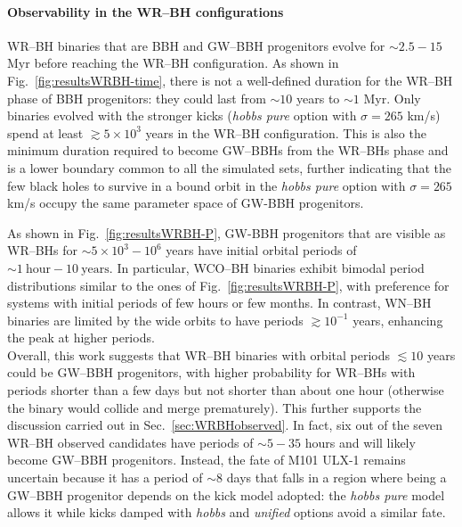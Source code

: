 \documentclass[a4paper,titlepage]{book}     	%
\begin{document}
\paragraph{Observability in the WR--BH configurations}
WR--BH binaries that are BBH and GW--BBH progenitors evolve for $\sim 2.5 - 15$ Myr before reaching the WR--BH configuration. As shown in Fig.\ \ref{fig:resultsWRBH-time}, there is not a well-defined duration for the WR--BH phase of BBH progenitors: they could last from $\sim 10$ years to $\sim 1$ Myr. Only binaries evolved with the stronger kicks (\emph{hobbs pure} option with $\sigma=265$ km/s) spend at least $\gtrsim 5 \times 10^3$ years in the WR--BH configuration. This is also the minimum duration required to become GW--BBHs from the WR--BHs phase and is a lower boundary common to all the simulated sets, further indicating that the few black holes to survive in a bound orbit in the \emph{hobbs pure} option with $\sigma=265$ km/s occupy the same parameter space of GW-BBH progenitors.

As shown in Fig.\ \ref{fig:resultsWRBH-P}, GW-BBH progenitors that are visible as WR--BHs for $\sim 5 \times 10^3 - 10^6$ years have initial orbital periods of $\sim 1~\text{hour} - 10~\text{years}$. In particular, WCO--BH binaries exhibit bimodal period distributions similar to the ones of Fig.\ \ref{fig:resultsWRBH-P}, with preference for systems with initial periods of few hours or few months. In contrast, WN--BH binaries are limited by the wide orbits to have periods $\gtrsim 10^{-1}$ years, enhancing the peak at higher periods.\\

Overall, this work suggests that WR--BH binaries with orbital periods $\lesssim 10$ years could be GW--BBH progenitors, with higher probability for WR--BHs with periods shorter than a few days but not shorter than about one hour (otherwise the binary would collide and merge prematurely). This further supports the discussion carried out in Sec.\ \ref{sec:WRBHobserved}. In fact, six out of the seven WR--BH observed candidates have periods of $\sim 5-35$ hours and will likely become GW--BBH progenitors. Instead, the fate of M101 ULX-1 remains uncertain because it has a period of $\sim 8$ days that falls in a region where being a GW--BBH progenitor depends on the kick model adopted: the \emph{hobbs pure} model allows it while kicks damped with \emph{hobbs} and \emph{unified} options avoid a similar fate.

\clearpage
\end{document}
